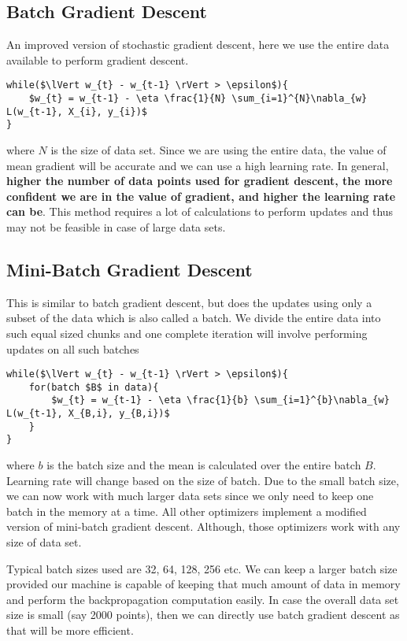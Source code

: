 \documentclass[../../deep_learning_notes.tex]{subfiles}
\begin{document}
\subsection{Batch Gradient Descent}
An improved version of stochastic gradient descent, here we use the entire data available to perform gradient descent.
\begin{lstlisting}
while($\lVert w_{t} - w_{t-1} \rVert > \epsilon$){
    $w_{t} = w_{t-1} - \eta \frac{1}{N} \sum_{i=1}^{N}\nabla_{w} L(w_{t-1}, X_{i}, y_{i})$
}
\end{lstlisting}
where $N$ is the size of data set. Since we are using the entire data, the value of mean gradient will be accurate and we can use a high learning rate. In general, \textbf{higher the number of data points used for gradient descent, the more confident we are in the value of gradient, and higher the learning rate can be}. This method requires a lot of calculations to perform updates and thus may not be feasible in case of large data sets.


\subsection{Mini-Batch Gradient Descent}
This is similar to batch gradient descent, but does the updates using only a subset of the data which is also called a batch. We divide the entire data into such equal sized chunks and one complete iteration will involve performing updates on all such batches
\begin{lstlisting}
while($\lVert w_{t} - w_{t-1} \rVert > \epsilon$){
    for(batch $B$ in data){
        $w_{t} = w_{t-1} - \eta \frac{1}{b} \sum_{i=1}^{b}\nabla_{w} L(w_{t-1}, X_{B,i}, y_{B,i})$
    }
}
\end{lstlisting}
where $b$ is the batch size and the mean is calculated over the entire batch $B$. Learning rate will change based on the size of batch. Due to the small batch size, we can now work with much larger data sets since we only need to keep one batch in the memory at a time. All other optimizers implement a modified version of mini-batch gradient descent. Although, those optimizers work with any size of data set.\newline

Typical batch sizes used are 32, 64, 128, 256 etc. We can keep a larger batch size provided our machine is capable of keeping that much amount of data in memory and perform the backpropagation computation easily. In case the overall data set size is small (say 2000 points), then we can directly use batch gradient descent as that will be more efficient.
\end{document}
